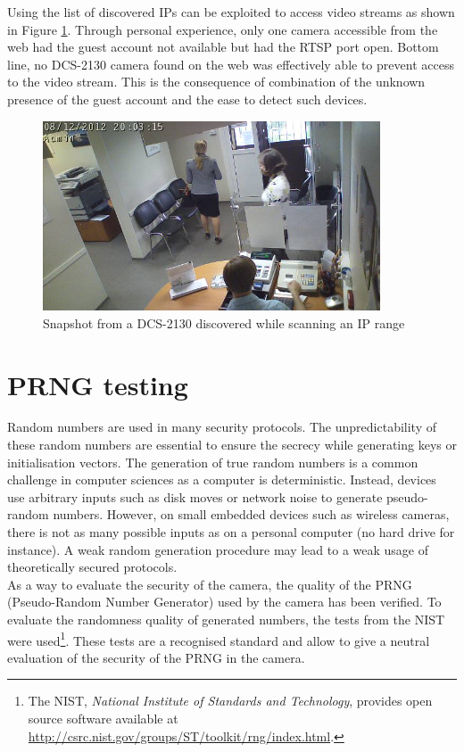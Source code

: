 Using the list of discovered IPs can be exploited to access video streams as shown in Figure \ref{fig:cam-snapshot}.
Through personal experience, only one camera accessible from the web had the guest account not available but had the RTSP port open.
Bottom line, no DCS-2130 camera found on the web was effectively able to prevent access to the video stream.
This is the consequence of combination of the unknown presence of the guest account and the ease to detect such devices.

\begin{figure}[h]
  \centering
  \includegraphics[width=10cm]{images/dms2.jpg}
  \caption{Snapshot from a DCS-2130 discovered while scanning an IP range}
  \label{fig:cam-snapshot}
\end{figure}

\section{PRNG testing}
\label{sec:dcs-random}

Random numbers are used in many security protocols.
The unpredictability of these random numbers are essential to ensure the secrecy while generating keys or initialisation vectors.
The generation of true random numbers is a common challenge in computer sciences as a computer is deterministic.
Instead, devices use arbitrary inputs such as disk moves or network noise to generate pseudo-random numbers.
However, on small embedded devices such as wireless cameras, there is not as many possible inputs as on a personal computer (no hard drive for instance).
A weak random generation procedure may lead to a weak usage of theoretically secured protocols.\\

As a way to evaluate the security of the camera, the quality of the PRNG (Pseudo-Random Number Generator) used by the camera has been verified.
To evaluate the randomness quality of generated numbers, the tests from the NIST were used\footnote{The NIST, \emph{National Institute of Standards and Technology}, provides open source software available at \url{http://csrc.nist.gov/groups/ST/toolkit/rng/index.html}.}.
These tests are a recognised standard and allow to give a neutral evaluation of the security of the PRNG in the camera.\\


